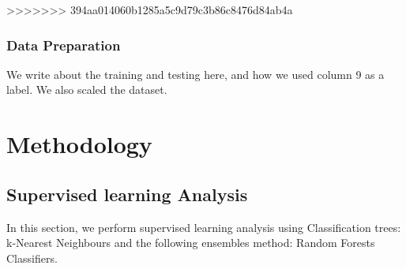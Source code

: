 \documentclass[12pt]{article}
\begin{document}
\begin{enumerate}
	
	
		
		
		
		
		
	
	
	
		
		
		
		
		
	
	
	
		
		
		
		
		
>>>>>>> 394aa014060b1285a5c9d79c3b86c8476d84ab4a
		
\end{enumerate}
 

\subsubsection{Data Preparation} 

We write about the training and testing here, and how we used column 9 as a label. We also scaled the dataset.\\

\section{Methodology}
\subsection{Supervised learning Analysis} 
 In this section, we perform supervised learning analysis using Classification trees: k-Nearest Neighbours and the following ensembles method: Random Forests Classifiers.\cite{zhou2012ensemble}
 
\end{document}
